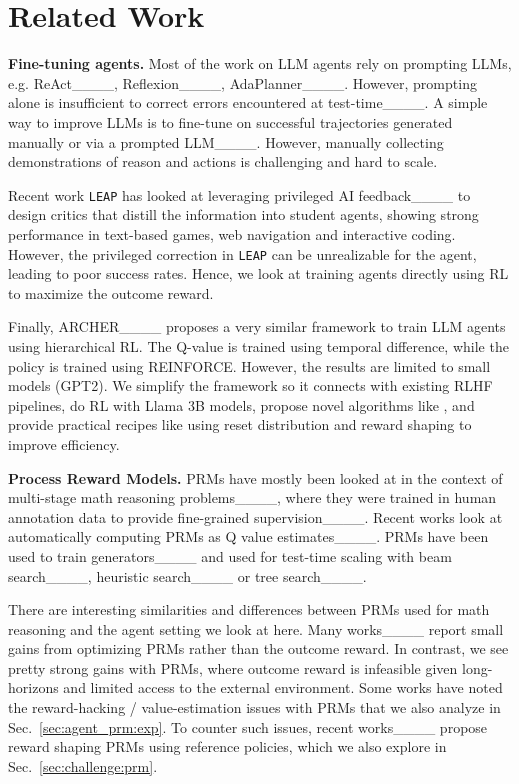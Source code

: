 \section{Related Work}
\vspace{-1em}

\textbf{Fine-tuning agents.} 
Most of the work on LLM agents rely on prompting LLMs, e.g. ReAct____, Reflexion____, AdaPlanner____. However, prompting alone is insufficient to correct errors encountered at test-time____. A simple way to improve LLMs is to fine-tune on successful trajectories generated manually or via a prompted LLM____. However, manually collecting demonstrations of reason and actions is challenging and hard to scale. 

Recent work \texttt{LEAP} has looked at leveraging privileged AI feedback____ to design critics that distill the information into student agents, showing strong performance in text-based games, web navigation and interactive coding. However, the privileged correction in \texttt{LEAP} can be unrealizable for the agent, leading to poor success rates. Hence, we look at training agents directly using RL to maximize the outcome reward. 

Finally, ARCHER____ proposes a very similar framework to train LLM agents using hierarchical RL. The Q-value is trained using temporal difference, while the policy is trained using REINFORCE. However, the results are limited to small models (GPT2). We simplify the framework so it connects with existing RLHF pipelines, do RL with Llama 3B models, propose novel algorithms like \inverseprm, and provide practical recipes like using reset distribution and reward shaping to improve efficiency. 

\textbf{Process Reward Models.} 
PRMs have mostly been looked at in the context of multi-stage math reasoning problems____, where they were trained in human annotation data to provide fine-grained supervision____. Recent works look at automatically computing PRMs as Q value estimates____. PRMs have been used to train generators____ and used for test-time scaling with beam search____, heuristic search____ or tree search____. 

There are interesting similarities and differences between PRMs used for math reasoning and the agent setting we look at here. Many works____ report small gains from optimizing PRMs rather than the outcome reward. In contrast, we see pretty strong gains with PRMs, where outcome reward is infeasible given long-horizons and limited access to the external environment. Some works have noted the reward-hacking / value-estimation issues with PRMs that we also analyze in Sec.~\ref{sec:agent_prm:exp}. To counter such issues, recent works____ propose reward shaping PRMs using reference policies, which we also explore in Sec.~\ref{sec:challenge:prm}.



\vspace{-1em}